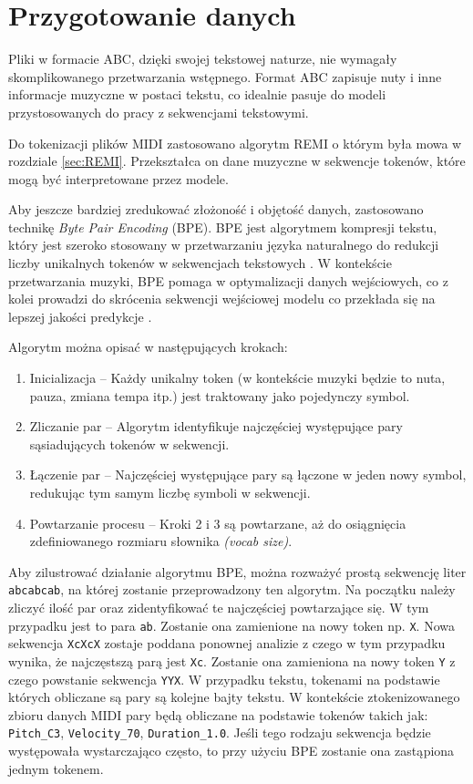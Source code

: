\documentclass[data-science]{agh-wi} %
\begin{document}
\section{Przygotowanie danych}
Pliki w formacie ABC, dzięki swojej tekstowej naturze, nie wymagały skomplikowanego przetwarzania wstępnego. Format ABC zapisuje nuty i inne informacje muzyczne w postaci tekstu, co idealnie pasuje do modeli przystosowanych do pracy z sekwencjami tekstowymi.

Do tokenizacji plików MIDI zastosowano algorytm REMI o którym była mowa w rozdziale \ref*{sec:REMI}. Przekształca on dane muzyczne w sekwencje tokenów, które mogą być interpretowane przez modele.

Aby jeszcze bardziej zredukować złożoność i objętość danych, zastosowano technikę \textit{Byte Pair Encoding} (BPE). BPE jest algorytmem kompresji tekstu, który jest szeroko stosowany w przetwarzaniu języka naturalnego do redukcji liczby unikalnych tokenów w sekwencjach tekstowych \cite{bpe}. W kontekście przetwarzania muzyki, BPE pomaga w optymalizacji danych wejściowych, co z kolei prowadzi do skrócenia sekwencji wejściowej modelu co przekłada się na lepszej jakości predykcje \cite*{fradet2023byte}.

\noindent Algorytm można opisać w następujących krokach:

\begin{enumerate}
    \item Inicializacja -- Każdy unikalny token (w kontekście muzyki będzie to nuta, pauza, zmiana tempa itp.) jest traktowany jako pojedynczy symbol.
    \item Zliczanie par -- Algorytm identyfikuje najczęściej występujące pary sąsiadujących tokenów w sekwencji.
    \item Łączenie par -- Najczęściej występujące pary są łączone w jeden nowy symbol, redukując tym samym liczbę symboli w sekwencji.
    \item Powtarzanie procesu -- Kroki 2 i 3 są powtarzane, aż do osiągnięcia zdefiniowanego rozmiaru słownika \textit{(vocab size)}.
\end{enumerate}

\noindent Aby zilustrować działanie algorytmu BPE, można rozważyć prostą sekwencję liter \texttt{abcabcab}, na której zostanie przeprowadzony ten algorytm. Na początku należy zliczyć ilość par oraz zidentyfikować te najczęściej powtarzające się. W tym przypadku jest to para \texttt{ab}. Zostanie ona zamienione na nowy token np. \texttt{X}. Nowa sekwencja \texttt{XcXcX} zostaje poddana ponownej analizie z czego w tym przypadku wynika, że najczęstszą parą jest \texttt{Xc}. Zostanie ona zamieniona na nowy token \texttt{Y} z czego powstanie sekwencja \texttt{YYX}. W przypadku tekstu, tokenami na podstawie których obliczane są pary są kolejne bajty tekstu. W kontekście ztokenizowanego zbioru danych MIDI pary będą obliczane na podstawie tokenów takich jak: \texttt{Pitch\_C3}, \texttt{Velocity\_70}, \texttt{Duration\_1.0}. Jeśli tego rodzaju sekwencja będzie występowała wystarczająco często, to przy użyciu BPE zostanie ona zastąpiona jednym tokenem.
\end{document}

